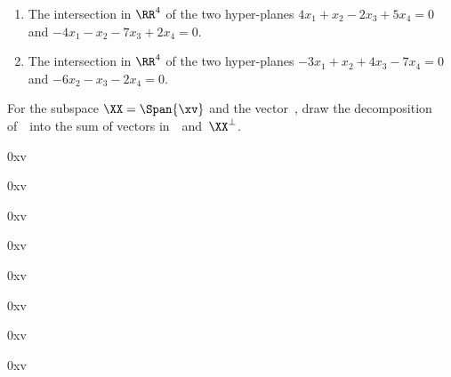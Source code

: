 \begin{exercise}
\begin{enumerate}

\item  The intersection in \(\RR^4\) of the two hyper-planes \(4x_1+x_2-2x_3+5x_4=0\) and \(-4x_1-x_2-7x_3+2x_4=0\). 

\item  The intersection in \(\RR^4\) of the two hyper-planes \(-3x_1+x_2+4x_3-7x_4=0\) and \(-6x_2-x_3-2x_4=0\). 

\end{enumerate}
\end{exercise}







\begin{exercise} \label{ex:} 
For the subspace \(\XX=\Span\{\xv\}\) and the vector~\vv, draw the decomposition of~\vv\ into the sum of vectors in~\XX\ and~\(\XX^\perp\).
\begin{parts}
\item {}0xv
\item {}0xv
\item {}0xv
\item {}0xv
\item {}0xv
\item {}0xv
\item {}0xv
\item {}0xv
\end{parts}
\end{exercise}




